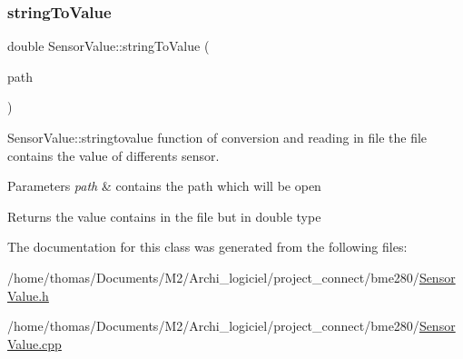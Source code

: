 \subsubsection{\texorpdfstring{string\+To\+Value}{stringToValue}}
{\footnotesize\ttfamily double Sensor\+Value\+::string\+To\+Value (\begin{DoxyParamCaption}\item[{Q\+String}]{path }\end{DoxyParamCaption})\hspace{0.3cm}{\ttfamily [slot]}}



Sensor\+Value\+::stringtovalue function of conversion and reading in file the file contains the value of differents sensor. 


\begin{DoxyParams}{Parameters}
{\em path} & contains the path which will be open \\
\hline
\end{DoxyParams}
\begin{DoxyReturn}{Returns}
the value contains in the file but in double type 
\end{DoxyReturn}


The documentation for this class was generated from the following files\+:\begin{DoxyCompactItemize}
\item 
/home/thomas/\+Documents/\+M2/\+Archi\+\_\+logiciel/project\+\_\+connect/bme280/\hyperlink{SensorValue_8h}{Sensor\+Value.\+h}\item 
/home/thomas/\+Documents/\+M2/\+Archi\+\_\+logiciel/project\+\_\+connect/bme280/\hyperlink{SensorValue_8cpp}{Sensor\+Value.\+cpp}\end{DoxyCompactItemize}
